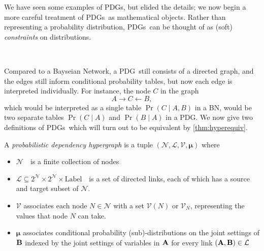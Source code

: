 \documentclass{article}
\newcommand\bmu{\boldsymbol{\mu}}
\newcommand{\V}{\mathcal V}
\newcommand{\N}{\mathcal N}
\newcommand{\Li}{\mathcal L}
\newcommand{\modelnamehyper}{probabilistic dependency hypergraph}
\newcommand{\MN}{PDG}
\newcommand{\MNH}{PDH}
\newcommand{\MNs}{\MN s}
\begin{document}
	We have seen some examples of \MNs, but elided the details; we now begin a more careful treatment of \MNs\ as mathematical objects. Rather than representing a probability distribution, \MNs\ can be thought of as (soft) \emph{constraints} on distributions.

	
	
	
	
	\todo\
	
	
	Compared to a Bayseian Network, a \MN\ still consists of a directed graph, and the edges still inform conditional probability tables, but now each edge is interpreted individually. For instance, the node $C$ in the graph
	\[ A \!\rightarrow\! C \!\leftarrow\! B,\]
	which would be interpreted as a single table $\Pr(C\mid A, B)$ in a BN, would be two separate tables $\Pr(C \mid A)$ and $\Pr(B \mid A)$ in a \MN. We now give two definitions of \MNs\, which will turn out to be equivalent by \cref{thm:hyperequiv}.

	
	\def\mnvars[#1]{(\mathcal N#1, \mathcal L#1, \mathcal V#1, \bmu#1)}
	\begin{defn}[\MNH]\label{def:hypermodel}
		A \emph{\modelnamehyper} is a tuple $\mnvars[]$ where
		\begin{itemize}[nosep]
			\item $\N$~~is a finite collection of nodes
			\item $\Li \subseteq 2^{\N} \times 2^{\N} \times \mathrm{Label}$~~is a set of directed links, each of which has a source and target subset of $\N$.
			\item $\V$ associates each node $N \in \mathcal N$ with a set $\V(N)$ or $\V_N$, representing the values that node $N$ can take.
			\item $\bmu$
			associates conditional probability (sub)-distributions on the joint settings of $\bf B$ indexed by the joint settings of variables in $\bf A$ for every link $({\bf A,B}) \in \mathcal L$ %
		\end{itemize}

	\end{defn}
\end{document}
